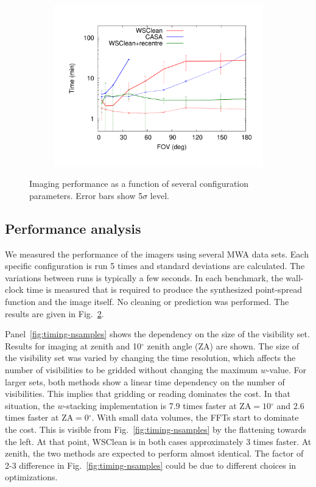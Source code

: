 \documentclass[useAMS,usenatbib]{mn2e}
\newcommand{\degree}{\ensuremath{^{\circ}}\xspace}
\begin{document}
\begin{figure}
\begin{subfigure}{.36\linewidth}
\includegraphics[width=\linewidth]{img/benchmark-fov/fov}
\caption{}
\label{fig:timing-fov}
\end{subfigure}%
\caption{Imaging performance as a function of several configuration parameters. Error bars show 5$\sigma$ level. }\label{fig:timings}
\end{figure}

\subsection{Performance analysis}

We measured the performance of the imagers using several MWA data sets. Each specific configuration is run 5 times and standard deviations are calculated. The variations between runs is typically a few seconds. In each benchmark, the wall-clock time is measured that is required to produce the synthesized point-spread function and the image itself. No cleaning or prediction was performed. The results are given in Fig.~\ref{fig:timings}.

Panel~\ref{fig:timing-nsamples} shows the dependency on the size of the visibility set. Results for imaging at zenith and 10\degree zenith angle (ZA) are shown. The size of the visibility set was varied by changing the time resolution, which affects the number of visibilities to be gridded without changing the maximum $w$-value. For larger sets, both methods show a linear time dependency on the number of visibilities. This implies that gridding or reading dominates the cost. In that situation, the $w$-stacking implementation is 7.9 times faster at $\textrm{ZA}=10\degree$ and 2.6 times faster at $\textrm{ZA}=0\degree$. With small data volumes, the FFTs start to dominate the cost. This is visible from Fig.~\ref{fig:timing-nsamples} by the flattening towards the left. At that point, WSClean is in both cases approximately 3 times faster. At zenith, the two methods are expected to perform almost identical. The factor of 2-3 difference in Fig.~\ref{fig:timing-nsamples} could be due to different choices in optimizations.
\end{document}
